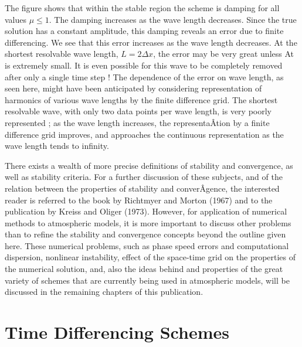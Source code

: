 The figure shows that within the stable region the scheme is damping for
all values \(\mu \leq 1\). The damping increases as the wave length
decreases. Since the true solution has a constant amplitude, this
damping reveals an error due to finite differencing. We see that this
error increases as the wave length decreases. At the shortest resolvable
wave length, \(L = 2\Delta x\), the error may be very great unless At is
extremely small. It is even possible for this wave to be completely
removed after only a single time step ! The dependence of the error on
wave length, as seen here, might have been anticipated by considering
representation of harmonics of various wave lengths by the finite
difference grid. The shortest resolvable wave, with only two data points
per wave length, is very poorly represented ; as the wave length
increases, the representaÂ­tion by a finite difference grid improves, and
approaches the continuous representation as the wave length tends to
infinity.

There exists a wealth of more precise definitions of stability and
convergence, as well as stability criteria. For a further discussion of
these subjects, and of the relation between the properties of stability
and converÂ­gence, the interested reader is referred to the book by
Richtmyer and Morton (1967) and to the publication by Kreiss and Oliger
(1973). However, for application of numerical methods to atmospheric
models, it is more important to discuss other problems than to refine
the stability and convergence concepts beyond the outline given here.
These numerical problems, such as phase speed errors and computational
dispersion, nonlinear instability, effect of the space-time grid on the
properties of the numerical solution, and, also the ideas behind and
properties of the great variety of schemes that are currently being used
in atmospheric models, will be discussed in the remaining chapters of
this publication.

\section{Time Differencing Schemes}\label{Chapter2}

